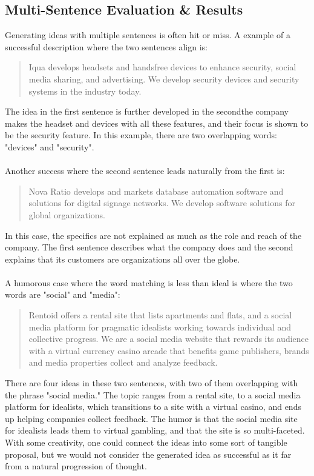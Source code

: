 \documentclass[11pt]{article}
\begin{document}
\subsection{Multi-Sentence Evaluation \& Results}

Generating ideas with multiple sentences is often hit or miss. A example of a successful description where the two sentences align is: 
\begin{quote} 
Iqua develops headsets and handsfree devices to enhance security, social media sharing, and advertising. We develop security devices and security systems in the industry today.
\end{quote}
The idea in the first sentence is further developed in the second\textemdash the company makes the headset and devices with all these features, and their focus is shown to be the security feature. In this example, there are two overlapping words: "devices" and "security". 
\\\\
Another success where the second sentence leads naturally from the first is:
\begin{quote}
Nova Ratio develops and markets database automation software and solutions for digital signage networks. We develop software solutions for global organizations.
\end{quote}
In this case, the specifics are not explained as much as the role and reach of the company. The first sentence describes what the company does and the second explains that its customers are organizations all over the globe.
\\\\
A humorous case where the word matching is less than ideal is where the two words are "social" and "media":
\begin{quote}
Rentoid offers a rental site that lists apartments and flats, and a social media platform for pragmatic idealists working towards individual and collective progress. We are a social media website that rewards its audience with a virtual currency casino arcade that benefits game publishers, brands and media properties collect and analyze feedback.
\end{quote}
There are four ideas in these two sentences, with two of them overlapping with the phrase "social media." The topic ranges from a rental site, to a social media platform for idealists, which transitions to a site with a virtual casino, and ends up helping companies collect feedback. The humor is that the social media site for idealists leads them to virtual gambling, and that the site is so multi-faceted. With some creativity, one could connect the ideas into some sort of tangible proposal, but we would not consider the generated idea as successful as it far from a natural progression of thought.
\end{document}
